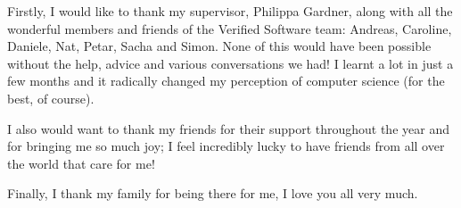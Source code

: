 Firstly, I would like to thank my supervisor, Philippa Gardner, along with all the wonderful members and friends of the Verified Software team: Andreas, Caroline, Daniele, Nat, Petar, Sacha and Simon. None of this would have been possible without the help, advice and various conversations we had! I learnt a lot in just a few months and it radically changed my perception of computer science (for the best, of course).

I also would want to thank my friends for their support throughout the year and for bringing me so much joy; I feel incredibly lucky to have friends from all over the world that care for me!

Finally, I thank my family for being there for me, I love you all very much.
